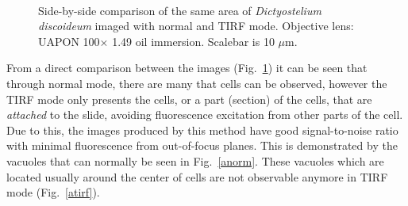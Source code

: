 \begin{figure}[h]
\centering
{} \hspace{0.1mm}
 \\
\caption[a: normal, b: opsec.]{Side-by-side comparison of the same area of \textit{Dictyostelium discoideum} imaged with normal and TIRF mode. 
Objective lens: UAPON 100$\times$ 1.49 oil immersion. 
Scalebar is 10 $\mu$m.} 
\label{fig:amoebatirf}
\end{figure}

From a direct comparison between the images (Fig.~\ref{fig:amoebatirf}) it can be seen that through normal mode, there are many that cells can be observed, however the TIRF mode only presents the cells, or a part (section) of the cells, that are \textit{attached} to the slide, avoiding fluorescence excitation from other parts of the cell. 
Due to this, the images produced by this method have good signal-to-noise ratio with minimal fluorescence from out-of-focus planes. 
This is demonstrated by the vacuoles that can normally be seen in Fig.~\ref{anorm}. These vacuoles which are located usually around the center of cells are not observable anymore in TIRF mode (Fig.~\ref{atirf}).


